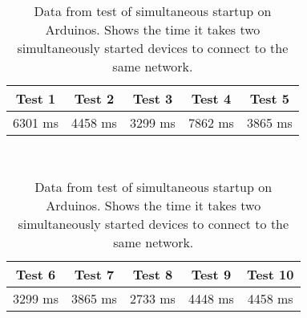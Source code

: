 \begin{table}[H]
\centering\footnotesize
\begin{tabular}{c | c | c | c | c }
Test 1 & Test 2 & Test 3 & Test 4 & Test 5 \\\midrule
6301 ms & 4458 ms & 3299 ms & 7862 ms & 3865 ms \\\bottomrule
\end{tabular}\\
\vspace{20pt}
\begin{tabular}{c | c | c | c | c }
Test 6 & Test 7 & Test 8 & Test 9 & Test 10\\\midrule
3299 ms & 3865 ms & 2733 ms & 4448 ms & 4458 ms \\\bottomrule
\end{tabular}
\caption{Data from test of simultaneous startup on Arduinos. Shows the time it takes two simultaneously started devices to connect to the same network.}
\label{graphConnectime}
\end{table} 